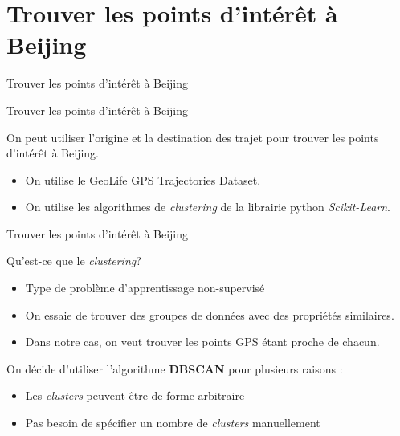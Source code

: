 \documentclass[aspectratio=169]{beamer}
\begin{document}

\section{Trouver les points d'intérêt à Beijing}

\begin{frame}{Trouver les points d'intérêt à Beijing}

\begin{center}
{\LARGE Trouver les points d'intérêt à Beijing}
\end{center}

On peut utiliser l'origine et la destination des trajet pour trouver les points d'intérêt à Beijing.

\begin{itemize}
	\item On utilise le GeoLife GPS Trajectories Dataset.
	\item On utilise les algorithmes de \textit{clustering} de la librairie python \textit{Scikit-Learn}\cite{pedregosa2011scikit}.
\end{itemize}
\end{frame}

\begin{frame}{Trouver les points d'intérêt à Beijing}

{\Large Qu'est-ce que le \textit{clustering}?}
\vspace{.5cm}

\begin{itemize}
	\item Type de problème d'apprentissage non-supervisé
	\item On essaie de trouver des groupes de données avec des propriétés similaires.
	\item Dans notre cas, on veut trouver les points GPS étant proche de chacun.
\end{itemize}
\vspace{.5cm}

On décide d'utiliser l'algorithme \textbf{DBSCAN}\cite{ester1996density} pour plusieurs raisons :
\begin{itemize}
	\item Les \textit{clusters} peuvent être de forme arbitraire
	\item Pas besoin de spécifier un nombre de \textit{clusters} manuellement
\end{itemize}
\end{frame}
\end{document}
